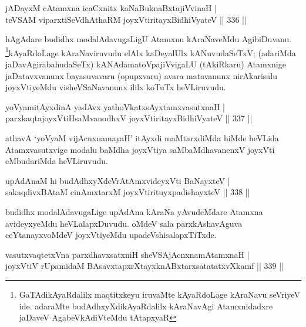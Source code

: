 \begin{shl}
jADayxM cA\s \s tamxna icaCxnitx kaNaBuknaBxtajiVvinaH | \\
teVSAM viparxtiSeVdhAthaRM joyxVtiritayxBidhiVyateV \hfill||  336 ||  
\end{shl}

\begin{artha}
hAgAdare budidhx modalAdavugaLigU Atamxnu kAraNaveMdu AgibiDuvanu. \footnote{GaTAdikAyaRdalilx maqtitxkeyu iruvaMte kAyaRdoLage kAraNavu seVriyeV ide. adaraMte budAdhxyXdikAyaRdalilx kAraNavAgi Atamxnidadxre jaDaveV AgabeVkAdiVteMdu tAtapxyaR}kAyaRdoLage kAraNaviruvudu elAlx kaDeyalUlx kANuvudaSeTxV; (adariMda jaDavAgirabahudaSeTx) kANAdamatoVpajiVvigaLU (tAkiRkaru) Atamxnige jaDatavxvanunx bayasuvavaru (opupxvaru) avara matavanunx nirAkarisalu joyxVtiyeMdu visheVSaNavanunx ililx koTuTx heVLiruvudu.
\end{artha}

\begin{shl}
yoV\s yamitAyxdinA yadAvx yathoVkatxsAyx\s \s tamxvasutxnaH | \\
\footnotemark[2]{}parxkaqtajoyxVtiHsaMvanodhxV joyxVtiritayxBidhiVyateV \hfill||  337 ||  
\end{shl}

\begin{artha}
athavA `yoV\s yaM vijAcnxnamayaH' itAyxdi maMtarxdiMda hiMde heVLida Atamxvasutxvige modalu baMdha joyxVtiya saMbaMdhavanenxV joyxVti eMbudariMda heVLiruvudu.
\end{artha}


\begin{shl}
upAdAnaM hi budAdhxyXdeVrAtAmxvideyxVti BaNayxteV | \\
sakaqdivxBAtaM cinAmxtarxM joyxVtirituyxpadishayxteV \hfill||  338 ||  
\end{shl}

\begin{artha}
budidhx modalAdavugaLige upAdAna kAraNa yAvudeMdare Atamxna avideyxyeMdu heVLalapxDuvudu. oMdeV sala parxkAshavAguva ceYtanayxvoMdeV joyxVtiyeMdu upadeVshisalapxTiTxde.
\end{artha}


\begin{shl}
vasutxvaqtetxVna parxdhavxsatxniH sheVSAjAcnxnamAtamxnaH | \\
joyxVtiV rUpamidaM BAsavxtapxrXtayxknABxtarxsatatatxvXkamf \hfill||  339 ||  
\end{shl}

